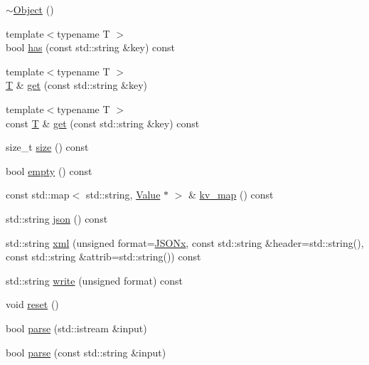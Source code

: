 \begin{DoxyCompactItemize}
\item 
\hyperlink{classjsonxx_1_1_object_ae4cfde759f40c3c6d7b75a7b24e6b98a}{$\sim$\+Object} ()
\item 
{\footnotesize template$<$typename T $>$ }\\bool \hyperlink{classjsonxx_1_1_object_addbf3358df897753b4b5957b1d1296d0}{has} (const std\+::string \&key) const 
\item 
{\footnotesize template$<$typename T $>$ }\\\hyperlink{http__parser_8c_ad24d0de3f597ca60dd95c4bc59c2ff73}{T} \& \hyperlink{classjsonxx_1_1_object_a7d2e8ae9c1dc2912cc38e014665f05d4}{get} (const std\+::string \&key)
\item 
{\footnotesize template$<$typename T $>$ }\\const \hyperlink{http__parser_8c_ad24d0de3f597ca60dd95c4bc59c2ff73}{T} \& \hyperlink{classjsonxx_1_1_object_a226eb9bb87f7551c715e73b55a2941f0}{get} (const std\+::string \&key) const 
\item 
size\+\_\+t \hyperlink{classjsonxx_1_1_object_a86962bd92e24121f2c94cf6406975a05}{size} () const 
\item 
bool \hyperlink{classjsonxx_1_1_object_aa6763556b7fb29a405fd489a13d67e2f}{empty} () const 
\item 
const std\+::map$<$ std\+::string, \hyperlink{classjsonxx_1_1_value}{Value} $\ast$ $>$ \& \hyperlink{classjsonxx_1_1_object_a8a84b6684c7cbf72dc8f2ceb5151f1f0}{kv\+\_\+map} () const 
\item 
std\+::string \hyperlink{classjsonxx_1_1_object_a6af0b2df182bae783c22425c8ad01c83}{json} () const 
\item 
std\+::string \hyperlink{classjsonxx_1_1_object_a6bd2fbc3dc8a672645bf2545e89bc204}{xml} (unsigned format=\hyperlink{namespacejsonxx_a1dc6d8d59422ab47976163f874939455af38f9355cff13d4780a62c136d156160}{J\+S\+O\+Nx}, const std\+::string \&header=std\+::string(), const std\+::string \&attrib=std\+::string()) const 
\item 
std\+::string \hyperlink{classjsonxx_1_1_object_ad3737bea1e8eb0d6fcccb3a3541ea1d4}{write} (unsigned format) const 
\item 
void \hyperlink{classjsonxx_1_1_object_a3f7350672e4b24b869d0a0db804656b2}{reset} ()
\item 
bool \hyperlink{classjsonxx_1_1_object_a3e44c6d5d666260fe71e97554b7fd064}{parse} (std\+::istream \&input)
\item 
bool \hyperlink{classjsonxx_1_1_object_a47ea79b45b1835b48e4b476c1262e043}{parse} (const std\+::string \&input)

\end{DoxyCompactItemize}

